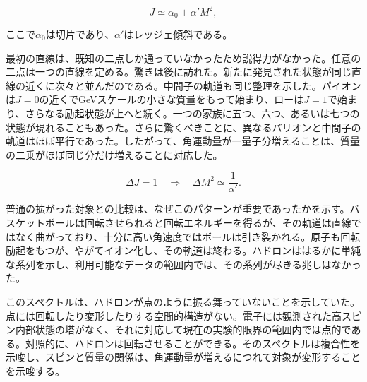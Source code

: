\begin{equation}
  J\simeq \alpha_0+\alpha' M^2,
  \label{eq:l01-regge-trajectory}
\end{equation}

ここで\(\alpha_0\)は切片であり、\(\alpha'\)はレッジェ傾斜である。

最初の直線は、既知の二点しか通っていなかったため説得力がなかった。任意の二点は一つの直線を定める。驚きは後に訪れた。新たに発見された状態が同じ直線の近くに次々と並んだのである。中間子の軌道も同じ整理を示した。パイオンは\(J=0\)の近くでGeVスケールの小さな質量をもって始まり、ローは\(J=1\)で始まり、さらなる励起状態が上へと続く。一つの家族に五つ、六つ、あるいは七つの状態が現れることもあった。さらに驚くべきことに、異なるバリオンと中間子の軌道はほぼ平行であった。したがって、角運動量が一量子分増えることは、質量の二乗がほぼ同じ分だけ増えることに対応した。

\begin{equation}
  \Delta J=1
  \quad\Longrightarrow\quad
  \Delta M^2\simeq \frac{1}{\alpha'}.
  \label{eq:l01-regge-spacing}
\end{equation}

\begin{classroomqa}
\end{classroomqa}

普通の拡がった対象との比較は、なぜこのパターンが重要であったかを示す。バスケットボールは回転させられると回転エネルギーを得るが、その軌道は直線ではなく曲がっており、十分に高い角速度ではボールは引き裂かれる。原子も回転励起をもつが、やがてイオン化し、その軌道は終わる。ハドロンははるかに単純な系列を示し、利用可能なデータの範囲内では、その系列が尽きる兆しはなかった。

このスペクトルは、ハドロンが点のように振る舞っていないことを示していた。点には回転したり変形したりする空間的構造がない。電子には観測された高スピン内部状態の塔がなく、それに対応して現在の実験的限界の範囲内では点的である。対照的に、ハドロンは回転させることができる。そのスペクトルは複合性を示唆し、スピンと質量の関係は、角運動量が増えるにつれて対象が変形することを示唆する。

